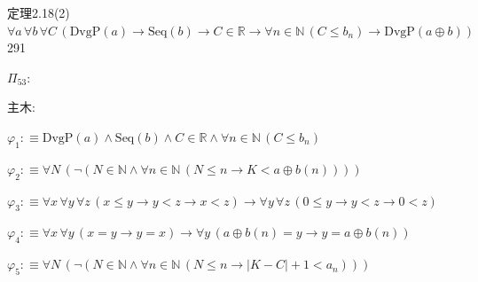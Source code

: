 \begin{fullproof}{定理2.18(2)}{$\forall a\,\forall b\,\forall C\,(\mathrm{DvgP}(a) \to \mathrm{Seq}(b) \to C \in \mathbb{R} \to \forall n \in \mathbb{N}\,(C \leq b_{n}) \to \mathrm{DvgP}(a \oplus b))$}{291}
\begin{ptree}
\noLine
{}
\end{ptree}
\noindent$\Pi_{53}$:
\begin{ptree}
\noLine
{}
\end{ptree}
\noindent 主木:
\begin{ptree}
\noLine
{}
\noLine
{}
\end{ptree}
\begin{abbrevlist}
\item $\varphi_{1} :\equiv \mathrm{DvgP}(a) \land \mathrm{Seq}(b) \land C \in \mathbb{R} \land \forall n \in \mathbb{N}\,(C \leq b_{n})$
\item $\varphi_{2} :\equiv \forall N\,(\neg (N \in \mathbb{N} \land \forall n \in \mathbb{N}\,(N \leq n \to K < a \oplus b(n))))$
\item $\varphi_{3} :\equiv \forall x\,\forall y\,\forall z\,(x \leq y \to y < z \to x < z) \to \forall y\,\forall z\,(0 \leq y \to y < z \to 0 < z)$
\item $\varphi_{4} :\equiv \forall x\,\forall y\,(x = y \to y = x) \to \forall y\,(a \oplus b(n) = y \to y = a \oplus b(n))$
\item $\varphi_{5} :\equiv \forall N\,(\neg (N \in \mathbb{N} \land \forall n \in \mathbb{N}\,(N \leq n \to \lvert K - C \rvert + 1 < a_{n})))$

\end{abbrevlist}
\end{fullproof}
